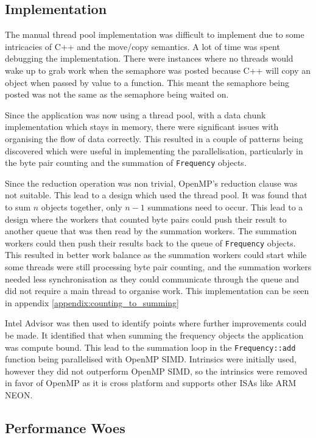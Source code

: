 \documentclass{article}
\begin{document}
\subsection{Implementation}

The manual thread pool implementation was difficult to implement due to some intricacies of C++ and the move/copy 
semantics. A lot of time was spent debugging the implementation. There were instances where no threads would 
wake up to grab work when the semaphore was posted because C++ will copy an object when passed by value to a 
function. This meant the semaphore being posted was not the same as the semaphore being waited on.

Since the application was now using a thread pool, with a data chunk implementation which stays in memory,
there were significant issues with organising the flow of data correctly. This resulted in a couple of patterns
being discovered which were useful in implementing the parallelisation, particularly in the byte pair counting 
and the summation of \texttt{Frequency} objects.

Since the reduction operation was non trivial, OpenMP's reduction clause was not suitable. This lead to a design
which used the thread pool. It was found that to sum $n$ objects together, only $n-1$ summations need to occur.
This lead to a design where the workers that counted byte pairs could push their result to another queue that 
was then read by the summation workers. The summation workers could then push their results back to the 
queue of \texttt{Frequency} objects. This resulted in better work balance as the summation workers 
could start while some threads were still processing byte pair counting, and the summation workers needed less
synchronisation as they could communicate through the queue and did not require a main thread to organise work.
This implementation can be seen in appendix \ref{appendix:counting_to_summing}

Intel Advisor was then used to identify points where further improvements could be made.
It identified that when summing the frequency objects the application was compute bound. This lead to 
the summation loop in the \texttt{Frequency::add} function being parallelised with OpenMP SIMD. Intrinsics
were initially used, however they did not outperform OpenMP SIMD, so the intrinsics were removed in favor of
OpenMP as it is cross platform and supports other ISAs like ARM NEON.

\subsection{Performance Woes}
\end{document}
